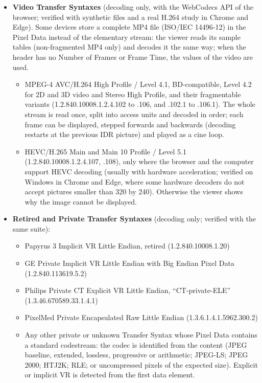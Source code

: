 \documentclass[11pt]{article}
\begin{document}
\begin{itemize}
  \item \textbf{Video Transfer Syntaxes} (decoding only, with the WebCodecs API of the browser; verified with synthetic files and a real H.264 study in Chrome and Edge). Some devices store a complete MP4 file (ISO/IEC 14496-12) in the Pixel Data instead of the elementary stream: the viewer reads its sample tables (non-fragmented MP4 only) and decodes it the same way; when the header has no Number of Frames or Frame Time, the values of the video are used.
  \begin{itemize}
    \item MPEG-4 AVC/H.264 High Profile / Level 4.1, BD-compatible, Level 4.2 for 2D and 3D video and Stereo High Profile, and their fragmentable variants (1.2.840.10008.1.2.4.102 to .106, and .102.1 to .106.1). The whole stream is read once, split into access units and decoded in order; each frame can be displayed, stepped forwards and backwards (decoding restarts at the previous IDR picture) and played as a cine loop.
    \item HEVC/H.265 Main and Main 10 Profile / Level 5.1 (1.2.840.10008.1.2.4.107, .108), only where the browser and the computer support HEVC decoding (usually with hardware acceleration; verified on Windows in Chrome and Edge, where some hardware decoders do not accept pictures smaller than 320 by 240). Otherwise the viewer shows why the image cannot be displayed.
  \end{itemize}

  \item \textbf{Retired and Private Transfer Syntaxes} (decoding only; verified with the same suite):
  \begin{itemize}
    \item Papyrus 3 Implicit VR Little Endian, retired (1.2.840.10008.1.20)
    \item GE Private Implicit VR Little Endian with Big Endian Pixel Data (1.2.840.113619.5.2)
    \item Philips Private CT Explicit VR Little Endian, ``CT-private-ELE'' (1.3.46.670589.33.1.4.1)
    \item PixelMed Private Encapsulated Raw Little Endian (1.3.6.1.4.1.5962.300.2)
    \item Any other private or unknown Transfer Syntax whose Pixel Data contains a standard codestream: the codec is identified from the content (JPEG baseline, extended, lossless, progressive or arithmetic; JPEG-LS; JPEG 2000; HTJ2K; RLE; or uncompressed pixels of the expected size). Explicit or implicit VR is detected from the first data element.
  \end{itemize}


\end{itemize}
\end{document}
